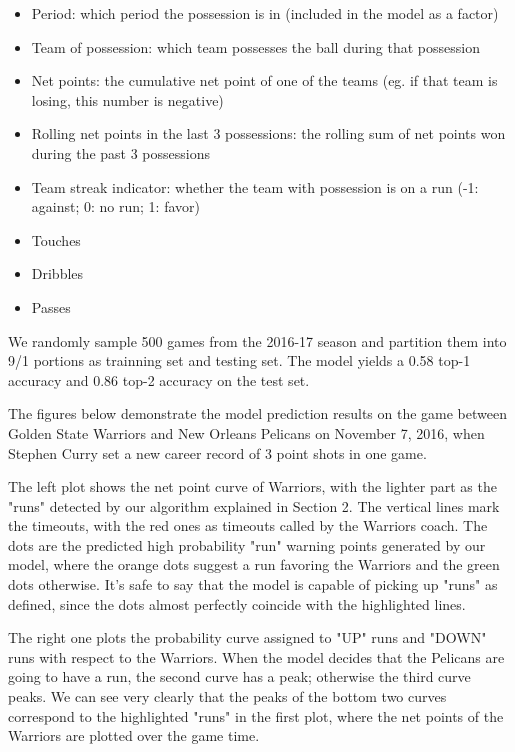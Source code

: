 \documentclass{article}
\begin{document}
\begin{itemize}
   \item  Period: which period the possession is in (included in the model as a factor)
   \item  Team of possession: which team possesses the ball during that possession
   \item  Net points: the cumulative net point of one of the teams (eg. if that team is losing, this number is negative)
   \item  Rolling net points in the last 3 possessions: the rolling sum of net points won during the past 3 possessions
   \item  Team streak indicator: whether the team with possession is on a run (-1: against; 0: no run; 1: favor)
   \item  Touches
   \item  Dribbles
   \item  Passes
\end{itemize}

We randomly sample 500 games from the 2016-17 season and partition them into 9/1 portions as trainning set and testing set. The model yields a 0.58 top-1 accuracy and 0.86 top-2 accuracy on the test set.\newline

The figures below demonstrate the model prediction results on the game between Golden State Warriors and New Orleans Pelicans on November 7, 2016, when Stephen Curry set a new career record of 3 point shots in one game. \newline

The left plot shows the net point curve of Warriors, with the lighter part as the "runs" detected by our algorithm explained in Section 2. The vertical lines mark the timeouts, with the red ones as timeouts called by the Warriors coach. The dots are the predicted high probability "run" warning points generated by our model, where the orange dots suggest a run favoring the Warriors and the green dots otherwise. It's safe to say that the model is capable of picking up "runs" as defined, since the dots almost perfectly coincide with the highlighted lines. \newline

The right one plots the probability curve assigned to "UP" runs and "DOWN" runs with respect to the Warriors. When the model decides that the Pelicans are going to have a run, the second curve has a peak; otherwise the third curve peaks. We can see very clearly that the peaks of the bottom two curves correspond to the highlighted "runs" in the first plot, where the net points of the Warriors are plotted over the game time.\newline
\end{document}
